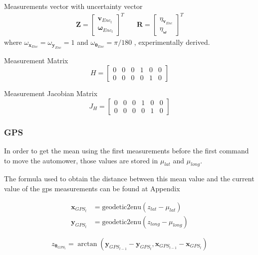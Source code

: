 Measurements vector with uncertainty vector
\begin{align}
\mathbf{Z}
=
\begin{bmatrix} 
\mathbf{v}_{Enc_t} \\
\boldsymbol \omega_{Enc_t} 
\end{bmatrix}^T
& \quad
\mathbf{R}
=
\begin{bmatrix} 
\eta_{\mathbf{v}_{Enc}} \\ 
\eta_{\boldsymbol \omega} 
\end{bmatrix}^T
\end{align}
where $ \omega_{\mathbf{x}_{Enc}} = \omega_{\mathbf{y}_{Enc}} = 1$ and 
$ \omega_{\boldsymbol \theta_{Enc}} = \pi/180 $ , experimentally derived.


Measurement Matrix
\begin{equation}
H
=
\begin{bmatrix} 
0 & 0 & 0 & 1 & 0 & 0 \\ 
0 & 0 & 0 & 0 & 1 & 0
\end{bmatrix}
\end{equation}

Measurement Jacobian Matrix
\begin{equation}
J_H
=
\begin{bmatrix} 
0 & 0 & 0 & 1 & 0 & 0 \\ 
0 & 0 & 0 & 0 & 1 & 0
\end{bmatrix}
\end{equation}


\subsubsection{GPS}

\noindent In order to get the mean using the first measurements before the first command to move the automower, those values are stored in $\mu_{lat}$ and $\mu_{long}$.

The formula used to obtain the distance between this mean value and the current value of the gps measurements can be found at Appendix

\begin{align}
\mathbf{x}_{GPS_t} & = \text{geodetic2enu}( z_{lat} - \mu_{lat})\\
\mathbf{y}_{GPS_t} & = \text{geodetic2enu}( z_{long} - \mu_{long})
\end{align}



\begin{equation}
z_{\boldsymbol \theta_{GPS_t}} = \arctan(\mathbf{y}_{GPS_{t-1}} - \mathbf{y}_{GPS_t}, \mathbf{x}_{GPS_{t-1}} - \mathbf{x}_{GPS_t} )
\end{equation}


